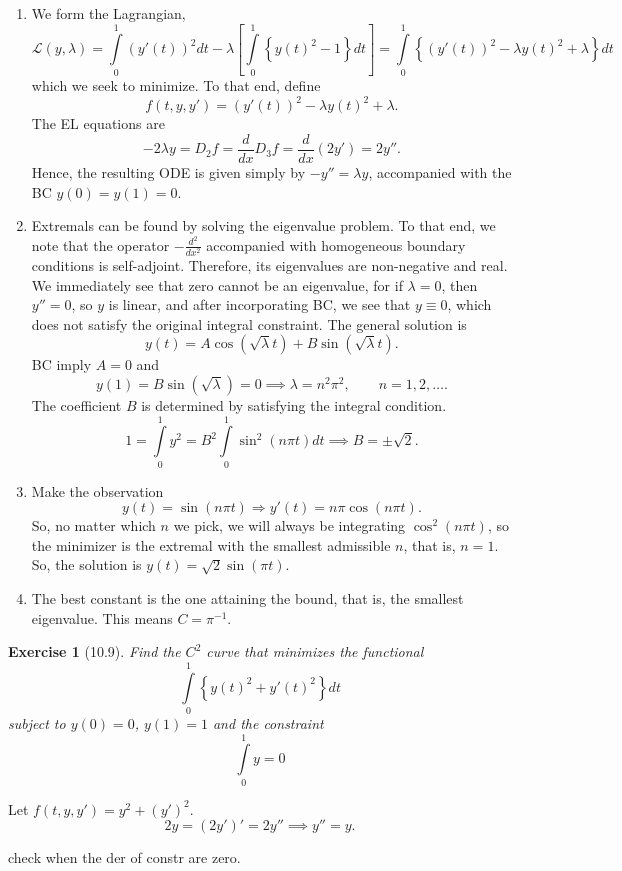 \documentclass[letterpaper,twoside,11pt]{article}
\theoremstyle{mystyle}
\newtheorem*{exercise}{Exercise}
\newcommand{\cbk}{\color{black}}
\newcommand{\cred}{\color{red}}
\newcommand{\cblu}{\color{blue}}
\begin{document}
\cblu 


\begin{enumerate}
  \item We form the Lagrangian, 
  \[\mathcal{L}\left( {y,\lambda } \right) = \int\limits_0^1 {{{\left( {y'\left( t \right)} \right)}^2}dt}  - \lambda \left[ {\int\limits_0^1 {\left\{ {y{{\left( t \right)}^2} - 1} \right\}dt} } \right] = \int\limits_0^1 {\left\{ {{{\left( {y'\left( t \right)} \right)}^2} - \lambda y{{\left( t \right)}^2} + \lambda } \right\}dt} \]
  which we seek to minimize. To that end, define 
  \[f(t, y, y') = {{{\left( {y'\left( t \right)} \right)}^2} - \lambda y{{\left( t \right)}^2} + \lambda }.\]
  The EL equations are
  \[ - 2\lambda y = {D_2}f = \frac{d}{{dx}}{D_3}f = \frac{d}{{dx}}\left( {2y'} \right) = 2y''.\]
  Hence, the resulting ODE is given simply by $-y'' = \lambda y$, accompanied with the BC $y(0) = y(1) = 0$. 
  \item Extremals can be found by solving the eigenvalue problem. To that end, we note that the operator $-\frac{d^2}{dx^2}$ accompanied with homogeneous boundary conditions is self-adjoint. Therefore, its eigenvalues are non-negative and real. We immediately see that zero cannot be an eigenvalue, for if $\lambda = 0$, then $y'' = 0$, so $y$ is linear, and after incorporating BC, we see that $y \equiv 0$, which does not satisfy the original integral constraint. The general solution is  
  \[y\left( t \right) = A\cos \left( {\sqrt \lambda  t} \right) + B\sin \left( {\sqrt \lambda  t} \right).\]
  BC imply $A = 0$ and 
  \[y\left( 1 \right) = B\sin \left( {\sqrt \lambda  } \right) = 0 \implies \lambda  = {n^2}{\pi ^2},\qquad n =1, 2, \dots .\]
  The coefficient $B$ is determined by satisfying the integral condition.
  \[1 = \int\limits_0^1 {{y^2}}  = {B^2}\int\limits_0^1 {{{\sin }^2}\left( {n\pi t} \right)dt}  \implies  B =  \pm \sqrt 2 .\]
  \item Make the observation 
  \[y\left( t \right) = \sin \left( {n\pi t} \right) \Rightarrow y'\left( t \right) = n\pi \cos \left( {n\pi t} \right).\]
  So, no matter which $n$ we pick, we will always be integrating $\cos^2(n\pi t)$, so the minimizer is the extremal with the smallest admissible $n$, that is, $n = 1$. So, the solution is $y(t) = \sqrt{2} \sin(\pi t)$. 
  \item The best constant is the one attaining the bound, that is, the smallest eigenvalue. This means $C = \pi^{-1}$. 
\end{enumerate}



\cbk 





\begin{exercise}[10.9]
  Find the $C^2$ curve that minimizes the functional 
  \[\int\limits_0^1 \left\{ y(t)^2 + y'(t)^2 \right\}dt \]
  subject to $y(0) = 0$, $y(1) = 1$ and the constraint 
  \[\int\limits_0^1 y = 0\]
\end{exercise}

\cblu 

Let $f(t, y, y') = y^2 + (y')^2$.
\[2y = \left( 2y' \right)'=2y'' \implies y''=y.\]

\cbk 

\cred check when the der of constr are zero.
\end{document}
